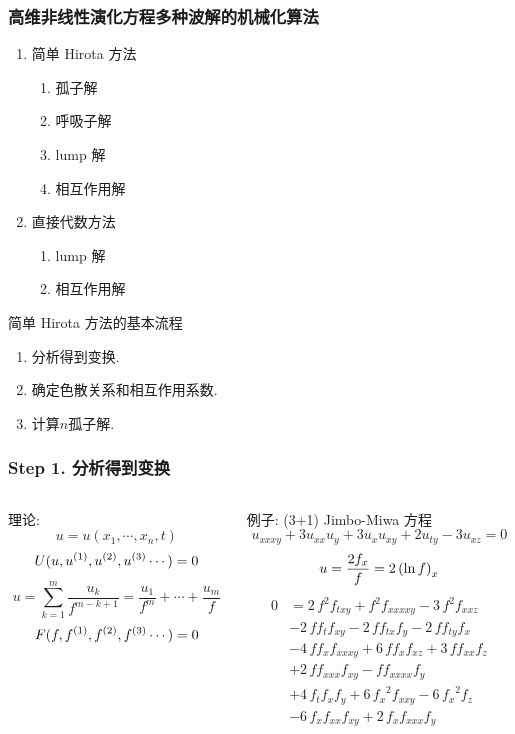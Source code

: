 \begin{frame}
\frametitle{高维非线性演化方程多种波解的机械化算法}
\begin{enumerate}
\item 简单 Hirota 方法
\begin{enumerate}
    \item 孤子解
    \item 呼吸子解
    \item lump 解
    \item 相互作用解 
\end{enumerate}
\item 直接代数方法
\begin{enumerate}
    \item lump 解 
    \item 相互作用解 
\end{enumerate}
\end{enumerate}
\end{frame}

\begin{frame}{简单 Hirota 方法的基本流程}
\begin{enumerate}
\item \Painleve{}分析得到变换. 
\item 确定色散关系和相互作用系数.
\item 计算$n$孤子解.
\end{enumerate}
\end{frame}


\begin{frame}
\frametitle{Step 1. \Painleve{}分析得到变换}
\begin{columns}
\small 
\begin{column}{0.5\textwidth}
理论:
\[
    u=u(x_1,\cdots,x_n,t)
\]
\[
    U(u,u^{(1)},u^{(2)},u^{(3)}\cdots)=0
\]
\[
    u=\sum_{k=1}^m{\frac{u_k}{f^{m-k+1}}}=\frac{u_1}{f^m}+\cdots+\frac{u_m}{f}
\]
\[
    F(f,f^{(1)},f^{(2)},f^{(3)}\cdots)=0
\]
\end{column}
\begin{column}{0.5\textwidth}
例子: (3+1) Jimbo-Miwa 方程
\[
    u_{xxxy}+3u_{xx}u_y+3u_{x}u_{xy}+2u_{ty}-3u_{xz}=0
\]
\[
    u=\frac{2f_x}{f}=2\left(\ln f\right)_x
\]
\[
\begin{aligned}
    0&=2\,{f}^{2}f_{{{ txy}}}+{f}^{2}f_{{{ xxxxy}}}-3\,{f}^{2}f_{{{ xxz}}}\\
    &-2\,ff_{{t}}f_{{{ xy}}}-2\,ff_{{{ tx}}}f_{{y}}-2\,ff_{{{ ty}}}f_{{x}}\\
    &-4\,ff_{{x}}f_{{{ xxxy}}}+6\,ff_{{x}}f_{{{ xz}}}+3\,ff_{{{ xx}}}f_{{z}}\\
    &+2\,ff_{{{ xxx}}}f_{{{xy}}}-ff_{{{ xxxx}}}f_{{y}}\\
    &+4\,f_{{t}}f_{{x}}f_{{y}}+6\,{f_{{x}}}^{2}f_{{{ xxy}}}-6\,{f_{{x}}}^{2}f_{{z}}\\
    &-6\,f_{{x}}f_{{{ xx}}}f_{{{ xy}}}+2\,f_{{x}}f_{{{ xxx}}}f_{{y}}
\end{aligned}
\]
\end{column}
\end{columns}
\end{frame}

